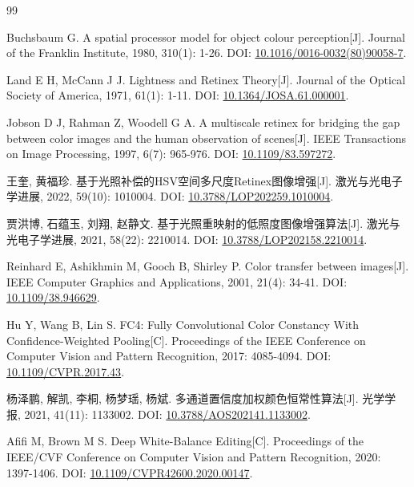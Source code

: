 \documentclass[UTF8,a4paper,zihao=5,fontset=none]{ctexart}
\begin{document}
\begin{thebibliography}{99}

Buchsbaum G. A spatial processor model for object colour perception[J]. Journal of the Franklin Institute, 1980, 310(1): 1-26.
DOI: \href{https://doi.org/10.1016/0016-0032(80)90058-7}{10.1016/0016-0032(80)90058-7}.

Land E H, McCann J J. Lightness and Retinex Theory[J]. Journal of the Optical Society of America, 1971, 61(1): 1-11.
DOI: \href{https://doi.org/10.1364/JOSA.61.000001}{10.1364/JOSA.61.000001}.

Jobson D J, Rahman Z, Woodell G A. A multiscale retinex for bridging the gap between color images and the human observation of scenes[J]. IEEE Transactions on Image Processing, 1997, 6(7): 965-976.
DOI: \href{https://doi.org/10.1109/83.597272}{10.1109/83.597272}.

王奎, 黄福珍. 基于光照补偿的HSV空间多尺度Retinex图像增强[J]. 激光与光电子学进展, 2022, 59(10): 1010004.
DOI: \href{https://doi.org/10.3788/LOP202259.1010004}{10.3788/LOP202259.1010004}.

贾洪博, 石蕴玉, 刘翔, 赵静文. 基于光照重映射的低照度图像增强算法[J]. 激光与光电子学进展, 2021, 58(22): 2210014.
DOI: \href{https://doi.org/10.3788/LOP202158.2210014}{10.3788/LOP202158.2210014}.

Reinhard E, Ashikhmin M, Gooch B, Shirley P. Color transfer between images[J]. IEEE Computer Graphics and Applications, 2001, 21(4): 34-41.
DOI: \href{https://doi.org/10.1109/38.946629}{10.1109/38.946629}.

Hu Y, Wang B, Lin S. FC4: Fully Convolutional Color Constancy With Confidence-Weighted Pooling[C]. Proceedings of the IEEE Conference on Computer Vision and Pattern Recognition, 2017: 4085-4094.
DOI: \href{https://doi.org/10.1109/CVPR.2017.43}{10.1109/CVPR.2017.43}.

杨泽鹏, 解凯, 李桐, 杨梦瑶, 杨斌. 多通道置信度加权颜色恒常性算法[J]. 光学学报, 2021, 41(11): 1133002.
DOI: \href{https://doi.org/10.3788/AOS202141.1133002}{10.3788/AOS202141.1133002}.

Afifi M, Brown M S. Deep White-Balance Editing[C]. Proceedings of the IEEE/CVF Conference on Computer Vision and Pattern Recognition, 2020: 1397-1406.
DOI: \href{https://doi.org/10.1109/CVPR42600.2020.00147}{10.1109/CVPR42600.2020.00147}.


\end{thebibliography}
\end{document}
